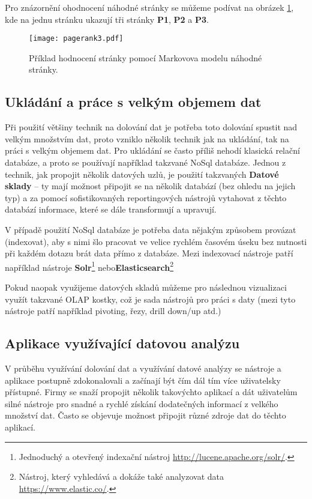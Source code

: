 \par Pro znázornění ohodnocení náhodné stránky se můžeme podívat na obrázek \ref{pageRankFig}, kde na jednu stránku ukazují tři stránky \textbf{P1}, \textbf{P2} a \textbf{P3}.
\begin{figure}[htp]
\centering
\texttt{[image: pagerank3.pdf]}
\caption{Příklad hodnocení stránky pomocí Markovova modelu náhodné stránky.}
\label{pageRankFig}
\end{figure}

\subsection{Ukládání a práce s velkým objemem dat}
\par Při použití většiny technik na dolování dat je potřeba toto dolování spustit nad velkým množstvím dat, proto vzniklo několik technik jak na ukládání, tak na práci s velkým objemem dat. Pro ukládání se často příliš nehodí klasická relační databáze, a proto se používají například takzvané NoSql databáze. Jednou z technik, jak propojit několik datových uzlů, je použití takzvaných \textbf{Datové sklady} -- ty mají možnost připojit se na několik databází (bez ohledu na jejich typ) a za pomocí sofistikovaných reportingových nástrojů vytahovat z těchto databází informace, které se dále transformují a upravují.

\par V případě použití NoSql databáze je potřeba data nějakým způsobem provázat (indexovat), aby s nimi šlo pracovat ve velice rychlém časovém úseku bez nutnosti při každém dotazu brát data přímo z databáze. Mezi indexovací nástroje patří například nástroje \textbf{Solr}\footnote{Jednoduchý a otevřený indexační nástroj \url{http://lucene.apache.org/solr/}.} nebo\textbf{Elasticsearch}\footnote{Nástroj, který vyhledává a dokáže také analyzovat data \url{https://www.elastic.co/}.}

\par Pokud naopak využijeme datových skladů můžeme pro následnou vizualizaci využít takzvané OLAP kostky, což je sada nástrojů pro práci s daty (mezi tyto nástroje patří například pivoting, řezy, drill down/up atd.)

\subsection{Aplikace využívající datovou analýzu}
\par V průběhu využívání dolování dat a využívání datové analýzy se nástroje a aplikace postupně zdokonalovali a začínají být čím dál tím více uživatelsky přístupné. Firmy se snaží propojit několik takovýchto aplikací a dát uživatelům silné nástroje pro snadné a rychlé získání dodatečných informací z velkého množství dat. Často se objevuje možnost připojit různé zdroje dat do těchto aplikací.

